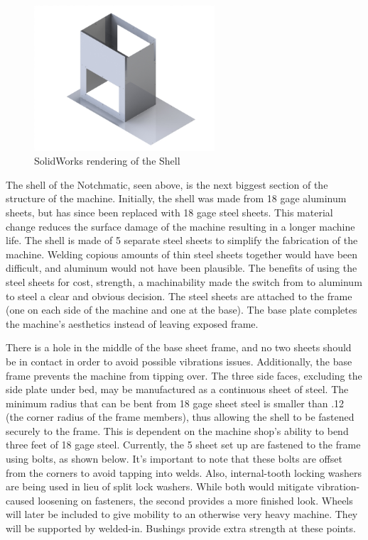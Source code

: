 \newpage

\begin{figure}[H]
    \centering
    \includegraphics[width=0.6\textwidth]{./fall-report pictures/Chapter2-MachineDescription/Shell}
    \caption{SolidWorks rendering of the Shell}
    \label{fig:Shell}
\end{figure}

The shell of the Notchmatic, seen above, is the next biggest section of the structure of the machine. Initially, the shell was made from 18 gage aluminum sheets, but has since been replaced with 18 gage steel sheets. This material change reduces the surface damage of the machine resulting in a longer machine life. The shell is made of 5 separate steel sheets to simplify the fabrication of the machine. Welding copious amounts of thin steel sheets together would have been difficult, and aluminum would not have been plausible. The benefits of using the steel sheets for cost, strength, a machinability made the switch from to aluminum to steel a clear and obvious decision. The steel sheets are attached to the frame (one on each side of the machine and one at the base). The base plate completes the machine's aesthetics instead of leaving exposed frame.
 
There is a hole in the middle of the base sheet frame, and no two sheets should be in contact in order to avoid possible vibrations issues. Additionally, the base frame prevents the machine from tipping over. The three side faces, excluding the side plate under bed, may be manufactured as a continuous sheet of steel. The minimum radius that can be bent from 18 gage sheet steel is smaller than .12 (the corner radius of the frame members), thus allowing the shell to be fastened securely to the frame. This is dependent on the machine shop's ability to bend three feet of 18 gage steel. Currently, the 5 sheet set up are fastened to the frame using bolts, as shown below. It's important to note that these bolts are offset from the corners to avoid tapping into welds. Also, internal-tooth locking washers are being used in lieu of split lock washers. While both would mitigate vibration-caused loosening on fasteners, the second provides a more finished look. Wheels will later be included to give mobility to an otherwise very heavy machine. They will be supported by welded-in. Bushings provide extra strength at these points.


